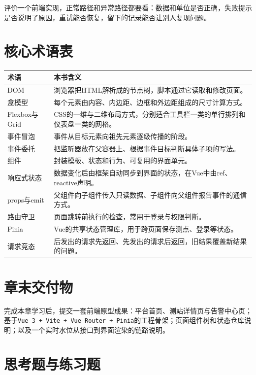 评价一个前端实现，正常路径和异常路径都要看：数据和单位是否正确，失败提示是否说明了原因，重试能否恢复，留下的记录能否让别人复现问题。

\section*{核心术语表}

\begin{longtable}{p{2.6cm}p{10.0cm}}
\toprule
术语 & 本书含义 \\
\midrule
DOM & 浏览器把HTML解析成的节点树，脚本通过它读取和修改页面。 \\
盒模型 & 每个元素由内容、内边距、边框和外边距组成的尺寸计算方式。 \\
Flexbox与Grid & CSS的一维与二维布局方式，分别适合工具栏一类的单行排列和仪表盘一类的网格。 \\
事件冒泡 & 事件从目标元素向祖先元素逐级传播的阶段。 \\
事件委托 & 把监听器放在父容器上、根据事件目标判断具体子项的写法。 \\
组件 & 封装模板、状态和行为、可复用的界面单元。 \\
响应式状态 & 数据变化后由框架自动同步到界面的状态，在Vue中由ref、reactive声明。 \\
props与emit & 父组件向子组件传入只读数据、子组件向父组件报告事件的通信方式。 \\
路由守卫 & 页面跳转前执行的检查，常用于登录与权限判断。 \\
Pinia & Vue的共享状态管理库，用于跨页面保存测点、登录等状态。 \\
请求竞态 & 后发出的请求先返回、先发出的请求后返回，旧结果覆盖新结果的问题。 \\
\bottomrule
\end{longtable}

\section*{章末交付物}

完成本章学习后，提交一套前端原型成果：平台首页、测站详情页与告警中心页；基于\texttt{Vue 3 + Vite + Vue Router + Pinia}的工程骨架；页面组件树和状态仓库说明；以及一个实时水位从接口到界面渲染的链路说明。

\section*{思考题与练习题}

